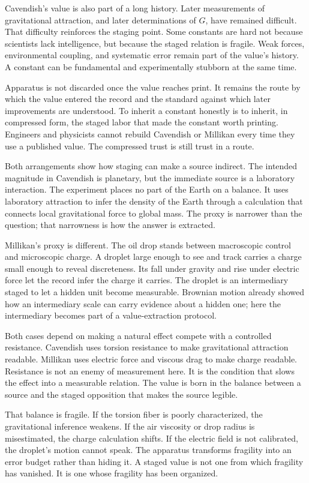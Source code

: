 Cavendish's value is also part of a long history. Later measurements of
gravitational attraction, and later determinations of \(G\), have remained
difficult. That difficulty reinforces the staging point. Some constants are
hard not because scientists lack intelligence, but because the staged
relation is fragile. Weak forces, environmental coupling, and systematic
error remain part of the value's history. A constant can be fundamental and
experimentally stubborn at the same time.

Apparatus is not discarded once the value reaches print. It remains the
route by which the value entered the record and the standard against which
later improvements are understood. To inherit a constant honestly is to
inherit, in compressed form, the staged labor that made the constant worth
printing. Engineers and physicists cannot rebuild Cavendish or Millikan
every time they use a published value. The compressed trust is still trust
in a route.

Both arrangements show how staging can make a source indirect. The intended
magnitude in Cavendish is planetary, but the immediate source is a
laboratory interaction. The experiment places no part of the Earth on a
balance. It uses laboratory attraction to infer the density of the Earth
through a calculation that connects local gravitational force to global
mass. The proxy is narrower than the question; that narrowness is how the
answer is extracted.

Millikan's proxy is different. The oil drop stands between macroscopic
control and microscopic charge. A droplet large enough to see and track
carries a charge small enough to reveal discreteness. Its fall under gravity
and rise under electric force let the record infer the charge it carries.
The droplet is an intermediary staged to let a hidden unit become
measurable. Brownian motion already showed how an intermediary scale can
carry evidence about a hidden one; here the intermediary becomes part of a
value-extraction protocol.

Both cases depend on making a natural effect compete with a controlled
resistance. Cavendish uses torsion resistance to make gravitational
attraction readable. Millikan uses electric force and viscous drag to make
charge readable. Resistance is not an enemy of measurement here. It is the
condition that slows the effect into a measurable relation. The value is
born in the balance between a source and the staged opposition that makes
the source legible.

That balance is fragile. If the torsion fiber is poorly characterized, the
gravitational inference weakens. If the air viscosity or drop radius is
misestimated, the charge calculation shifts. If the electric field is not
calibrated, the droplet's motion cannot speak. The apparatus transforms
fragility into an error budget rather than hiding it. A staged value is not
one from which fragility has vanished. It is one whose fragility has been
organized.

